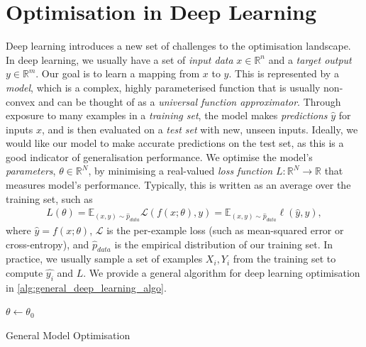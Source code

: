 \section{Optimisation in Deep Learning}
\label{sec:optimisation_in_deep_learning}

Deep learning introduces a new set of challenges to the optimisation landscape. In deep learning, we usually have a set of \textit{input data} $x \in \mathbb{R}^n$ and a \textit{target output} $y \in \mathbb{R}^m$. Our goal is to learn a mapping from $x$ to $y$. This is represented by a \textit{model}, which is a complex, highly parameterised function that is usually non-convex and can be thought of as a \textit{universal function approximator}. Through exposure to many examples in a \textit{training set}, the model makes \textit{predictions} $\hat{y}$ for inputs $x$, and is then evaluated on a \textit{test set} with new, unseen inputs. Ideally, we would like our model to make accurate predictions on the test set, as this is a good indicator of generalisation performance. We optimise the model's \textit{parameters}, $\theta \in \mathbb{R}^N$, by minimising a real-valued \textit{loss function} $L: \mathbb{R}^N \to \mathbb{R}$ that measures model's performance. Typically, this is written as an average over the training set, such as
\begin{align}
    L(\theta) = \mathbb{E}_{(x, y) \sim \hat{p}_{data}} \mathcal{L}(f(x; \theta), y) = \mathbb{E}_{(x, y) \sim \hat{p}_{data}} \ell(\hat{y}, y),
    \label{eq:loss_function}
\end{align}
where $\hat{y} = f(x; \theta)$, $\mathcal{L}$ is the per-example loss (such as mean-squared error or cross-entropy), and $\hat{p}_{data}$ is the empirical distribution of our training set. In practice, we usually sample a set of examples $X_i, Y_i$ from the training set to compute $\hat{y_i}$ and $L$. We provide a general algorithm for deep learning optimisation in \cref{alg:general_deep_learning_algo}.

\begin{algorithm}[H]
    \DontPrintSemicolon
    $\theta \leftarrow \theta_0$\;
    \Return{$\theta$}
    \caption{General Model Optimisation}
    \label{alg:general_deep_learning_algo}
\end{algorithm}


